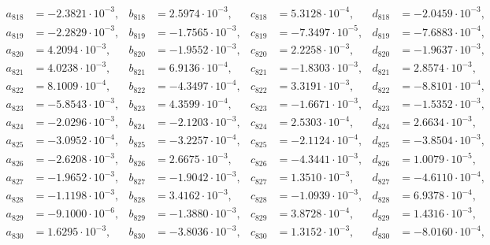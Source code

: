 \begin{align*}
  a_{ 818 } &= -2.3821 \cdot 10^{ -3 }, & b_{ 818 } &= 2.5974 \cdot 10^{ -3 }, & c_{ 818 } &= 5.3128 \cdot 10^{ -4 }, & d_{ 818 } &= -2.0459 \cdot 10^{ -3 }, \\ 
  a_{ 819 } &= -2.2829 \cdot 10^{ -3 }, & b_{ 819 } &= -1.7565 \cdot 10^{ -3 }, & c_{ 819 } &= -7.3497 \cdot 10^{ -5 }, & d_{ 819 } &= -7.6883 \cdot 10^{ -4 }, \\ 
  a_{ 820 } &= 4.2094 \cdot 10^{ -3 }, & b_{ 820 } &= -1.9552 \cdot 10^{ -3 }, & c_{ 820 } &= 2.2258 \cdot 10^{ -3 }, & d_{ 820 } &= -1.9637 \cdot 10^{ -3 }, \\ 
  a_{ 821 } &= 4.0238 \cdot 10^{ -3 }, & b_{ 821 } &= 6.9136 \cdot 10^{ -4 }, & c_{ 821 } &= -1.8303 \cdot 10^{ -3 }, & d_{ 821 } &= 2.8574 \cdot 10^{ -3 }, \\ 
  a_{ 822 } &= 8.1009 \cdot 10^{ -4 }, & b_{ 822 } &= -4.3497 \cdot 10^{ -4 }, & c_{ 822 } &= 3.3191 \cdot 10^{ -3 }, & d_{ 822 } &= -8.8101 \cdot 10^{ -4 }, \\ 
  a_{ 823 } &= -5.8543 \cdot 10^{ -3 }, & b_{ 823 } &= 4.3599 \cdot 10^{ -4 }, & c_{ 823 } &= -1.6671 \cdot 10^{ -3 }, & d_{ 823 } &= -1.5352 \cdot 10^{ -3 }, \\ 
  a_{ 824 } &= -2.0296 \cdot 10^{ -3 }, & b_{ 824 } &= -2.1203 \cdot 10^{ -3 }, & c_{ 824 } &= 2.5303 \cdot 10^{ -4 }, & d_{ 824 } &= 2.6634 \cdot 10^{ -3 }, \\ 
  a_{ 825 } &= -3.0952 \cdot 10^{ -4 }, & b_{ 825 } &= -3.2257 \cdot 10^{ -4 }, & c_{ 825 } &= -2.1124 \cdot 10^{ -4 }, & d_{ 825 } &= -3.8504 \cdot 10^{ -3 }, \\ 
  a_{ 826 } &= -2.6208 \cdot 10^{ -3 }, & b_{ 826 } &= 2.6675 \cdot 10^{ -3 }, & c_{ 826 } &= -4.3441 \cdot 10^{ -3 }, & d_{ 826 } &= 1.0079 \cdot 10^{ -5 }, \\ 
  a_{ 827 } &= -1.9652 \cdot 10^{ -3 }, & b_{ 827 } &= -1.9042 \cdot 10^{ -3 }, & c_{ 827 } &= 1.3510 \cdot 10^{ -3 }, & d_{ 827 } &= -4.6110 \cdot 10^{ -4 }, \\ 
  a_{ 828 } &= -1.1198 \cdot 10^{ -3 }, & b_{ 828 } &= 3.4162 \cdot 10^{ -3 }, & c_{ 828 } &= -1.0939 \cdot 10^{ -3 }, & d_{ 828 } &= 6.9378 \cdot 10^{ -4 }, \\ 
  a_{ 829 } &= -9.1000 \cdot 10^{ -6 }, & b_{ 829 } &= -1.3880 \cdot 10^{ -3 }, & c_{ 829 } &= 3.8728 \cdot 10^{ -4 }, & d_{ 829 } &= 1.4316 \cdot 10^{ -3 }, \\ 
  a_{ 830 } &= 1.6295 \cdot 10^{ -3 }, & b_{ 830 } &= -3.8036 \cdot 10^{ -3 }, & c_{ 830 } &= 1.3152 \cdot 10^{ -3 }, & d_{ 830 } &= -8.0160 \cdot 10^{ -4 }, \\ 

\end{align*}
